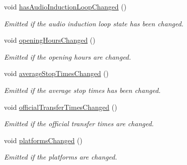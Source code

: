\begin{DoxyCompactItemize}
void \mbox{\hyperlink{classQRail_1_1StationEngine_1_1Station_aa4438de170a13eaeca8768b7cd7e9de0}{has\+Audio\+Induction\+Loop\+Changed}} ()
\begin{DoxyCompactList}\small\item\em Emitted if the audio induction loop state has been changed. \end{DoxyCompactList}\item 
void \mbox{\hyperlink{classQRail_1_1StationEngine_1_1Station_a6dda0c58b3e6e9cbb4d4868ab785b088}{opening\+Hours\+Changed}} ()
\begin{DoxyCompactList}\small\item\em Emitted if the opening hours are changed. \end{DoxyCompactList}\item 
void \mbox{\hyperlink{classQRail_1_1StationEngine_1_1Station_a090521d89bd6795fbf096607e8c7ad1f}{average\+Stop\+Times\+Changed}} ()
\begin{DoxyCompactList}\small\item\em Emitted if the average stop times has been changed. \end{DoxyCompactList}\item 
void \mbox{\hyperlink{classQRail_1_1StationEngine_1_1Station_adae404be1a36e3ef4298afb7bf062f2f}{official\+Transfer\+Times\+Changed}} ()
\begin{DoxyCompactList}\small\item\em Emitted if the official transfer times are changed. \end{DoxyCompactList}\item 
void \mbox{\hyperlink{classQRail_1_1StationEngine_1_1Station_a2e20934310ee8ab026ef4334fd99cdbd}{platforms\+Changed}} ()
\begin{DoxyCompactList}\small\item\em Emitted if the platforms are changed. \end{DoxyCompactList}\end{DoxyCompactItemize}
